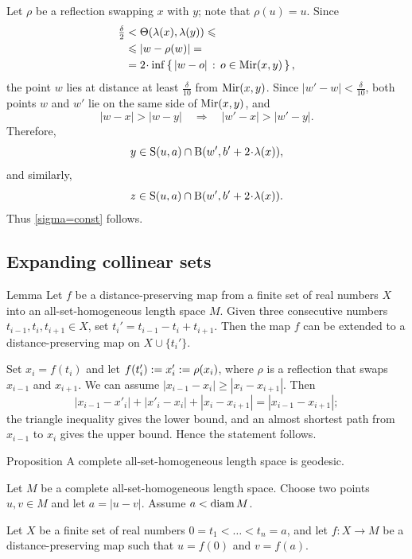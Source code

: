 \documentclass[a4paper,10pt]{article}
\begin{document}
Let $\rho$ be a reflection swapping $x$ with $y$;
note that $\rho(u)=u$.
Since
\begin{align*}
\tfrac\delta2&<\Theta(\lambda(x),\lambda(y))
\leqslant
\\
&\leqslant
|w-\rho(w)|=
\\
&=
2\cdot\inf\set{|w-o|}{o\in \Bis(x,y)},
\end{align*}
the point $w$ lies at distance at least $\tfrac\delta{10}$ from $\mathrm{Mir}(x,y)$.
Since $|w'-w|<\tfrac\delta{10}$, both points $w$ and $w'$ lie on the same side of $\mathrm{Mir}(x,y)$, and
\[|w-x|>|w-y|
\quad\Rightarrow\quad
|w'-x|>|w'-y|.\]
Therefore,
\[y\in \Sph(u,a)\cap \Ball(w',b'+2\cdot\lambda(x)),\]
and similarly,
\[z\in \Sph(u,a)\cap \Ball(w',b'+2\cdot\lambda(x)).\]
Thus \ref{sigma=const} follows.
\qeds

\subsection*{Expanding collinear sets}

\begin{thm}{Lemma}\label{cor:plus-one}
Let $f$ be a distance-preserving map from a finite set of real numbers $X$ into an all-set-homogeneous length space $M$.
Given three consecutive numbers $t_{i-1},t_i,t_{i+1}\in X$, set $t_i'=t_{i-1}-t_i +t_{i+1}$.
Then the map $f$ can be extended to a distance-preserving map on $X\cup\{t_i'\}$.
\end{thm}

Set $x_i=f(t_i)$ and let $f(t_i')\mathrel{{:}{=}} x_i'\mathrel{{:}{=}}\rho(x_i)$, where $\rho$ is a reflection that swaps $x_{i-1}$ and $x_{i+1}$.
We can assume $|x_{i-1}-x_i|\geqslant |x_i-x_{i+1}|$.
Then
\[|x_{i-1}-x'_i|+|x'_i-x_i|+|x_i-x_{i+1}|=|x_{i-1}-x_{i+1}|;\]
the triangle inequality gives the lower bound, and an almost shortest path from
$x_{i-1}$ to $x_i$ gives the upper bound.
Hence the statement follows.
\qeds

\begin{thm}{Proposition}\label{prop:ash>geodesic}
A complete all-set-homogeneous length space is geodesic.
\end{thm}

Let $M$ be a complete all-set-homogeneous length space.
Choose two points $u,v\in M$ and let $a=|u-v|$.
Assume $a<\mathop{\rm diam}\nolimits M$.

Let $X$ be a finite set of real numbers $0=t_1<\ldots<t_n=a$,
and let $f\colon X\to M$ be a distance-preserving map such that $u=f(0)$ and $v=f(a)$.
\end{document}
